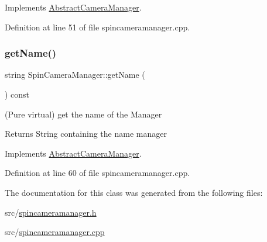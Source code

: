 Implements \mbox{\hyperlink{class_abstract_camera_manager_a8e215b2531fd8c18551382dc8f571817}{Abstract\+Camera\+Manager}}.



Definition at line 51 of file spincameramanager.\+cpp.

\mbox{\label{class_spin_camera_manager_ac3ea32324ae75d80e9b1e3108ee9c6d2}} 
\subsubsection{\texorpdfstring{getName()}{getName()}}
{\footnotesize\ttfamily string Spin\+Camera\+Manager\+::get\+Name (\begin{DoxyParamCaption}{ }\end{DoxyParamCaption}) const\hspace{0.3cm}{\ttfamily [virtual]}}



(Pure virtual) get the name of the Manager 

\begin{DoxyReturn}{Returns}
String containing the name manager 
\end{DoxyReturn}


Implements \mbox{\hyperlink{class_abstract_camera_manager_a6e4b041842471b9ed42ddd5c9ab260d1}{Abstract\+Camera\+Manager}}.



Definition at line 60 of file spincameramanager.\+cpp.



The documentation for this class was generated from the following files\+:\begin{DoxyCompactItemize}
\item 
src/\mbox{\hyperlink{spincameramanager_8h}{spincameramanager.\+h}}\item 
src/\mbox{\hyperlink{spincameramanager_8cpp}{spincameramanager.\+cpp}}\end{DoxyCompactItemize}
